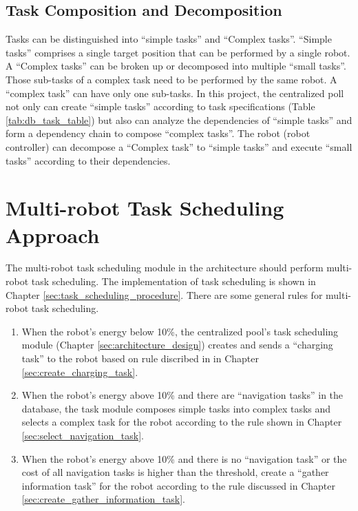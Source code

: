 \subsection{Task Composition and Decomposition}
Tasks can be distinguished into ``simple tasks'' and ``Complex tasks''. ``Simple tasks'' comprises a single target position that can be performed by a single robot. A ``Complex tasks'' can be broken up or decomposed into multiple ``small tasks''. Those sub-tasks of a complex task need to be performed by the same robot. A ``complex task'' can have only one sub-tasks.
In this project, the centralized poll not only can create ``simple tasks'' according to task specifications (Table \ref{tab:db_task_table}) but also can analyze the dependencies of ``simple tasks'' and form a dependency chain to compose ``complex tasks''. The robot (robot controller) can decompose a ``Complex task'' to ``simple tasks'' and execute ``small tasks'' according to their dependencies.

\section{Multi-robot Task Scheduling Approach}
\label{sec:task_scheduling_approach}

The multi-robot task scheduling module in the architecture should perform multi-robot task scheduling. 
The implementation of task scheduling is shown in Chapter \ref{sec:task_scheduling_procedure}. There are some general rules for multi-robot task scheduling.


\begin{enumerate}
 \item When the robot's energy below 10\%, the centralized pool's task scheduling module (Chapter \ref{sec:architecture_design}) creates and sends a ``charging task''  to the robot based on rule discribed in in Chapter \ref{sec:create_charging_task}.

 \item When the robot's energy above 10\% and there are ``navigation tasks'' in the database, the task module composes simple tasks into complex tasks and selects a complex task for the robot according to the rule shown in Chapter \ref{sec:select_navigation_task}.

 \item  When the robot's energy above 10\% and there is no ``navigation task'' or the cost of all navigation tasks is higher than the threshold, create a ``gather information task'' for the robot according to the rule discussed in Chapter  \ref{sec:create_gather_information_task}.
\end{enumerate}

